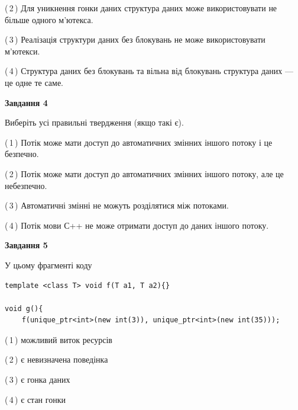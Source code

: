 \documentclass[12pt, ukrainian]{article}
\begin{document}
\begin {large}
{(\,2\,) Для уникнення гонки даних структура даних може використовувати не більше одного м’ютекса.%

(\,3\,) Реалізація структури даних без блокувань не може використовувати м’ютекси.%

(\,4\,) Структура даних без блокувань та вільна від блокувань структура даних --- це одне те саме.%



\begin{center}
\textbf{Завдання 4}
\end{center}
Виберіть усі правильні твердження (якщо такі є).\par
\vspace{2mm}

(\,1\,) Потік може мати доступ до автоматичних змінних іншого потоку і це безпечно.%

(\,2\,) Потік може мати доступ до автоматичних змінних іншого потоку, але це небезпечно.%

(\,3\,) Автоматичні змінні не можуть розділятися між потоками.%

(\,4\,) Потік мови С++ не може отримати доступ до даних іншого потоку.%



\begin{center}
\textbf{Завдання 5}
\end{center}
У цьому фрагменті коду
\begin{verbatim}
template <class T> void f(T a1, T a2){}

void g(){
    f(unique_ptr<int>(new int(3)), unique_ptr<int>(new int(35)));
\end{verbatim}

(\,1\,) можливий виток ресурсів%

(\,2\,) є невизначена поведінка%

(\,3\,) є гонка даних%

(\,4\,) є стан гонки%


}
\end {large}
\end{document}
